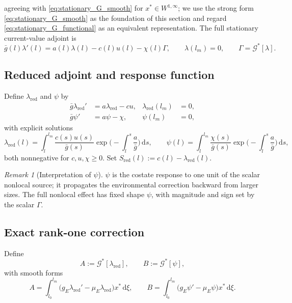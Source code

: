 \documentclass[pdflatex,sn-mathphys-num]{sn-jnl}
\newcommand{\dd}{\,\mathrm{d}}
\theoremstyle{plain}
\theoremstyle{definition}
\theoremstyle{remark}
\newtheorem{remark}[theorem]{Remark}
\begin{document}
agreeing with \eqref{eq:stationary_G_smooth} for $x^*\in W^{1,\infty}$; we use the
strong form \eqref{eq:stationary_G_smooth} as the foundation of this section and
regard \eqref{eq:stationary_G_functional} as an equivalent representation. The
full stationary current-value adjoint is
\begin{equation}\label{eq:full_stationary_adjoint}
\bar g(l)\lambda'(l)=a(l)\lambda(l)-c(l)u(l)-\chi(l)\Gamma,
\qquad
\lambda(l_m)=0,
\qquad
\Gamma=\mathcal G^*[\lambda].
\end{equation}

\subsection{Reduced adjoint and response function}
\label{subsec:reduced_auxiliary}

Define $\lambda_{\mathrm{red}}$ and $\psi$ by
\begin{align}
\bar g\lambda_{\mathrm{red}}'&=a\lambda_{\mathrm{red}}-cu,
&\lambda_{\mathrm{red}}(l_m)&=0,
\label{eq:reduced_adjoint}\\
\bar g\psi'&=a\psi-\chi,
&\psi(l_m)&=0,
\label{eq:auxiliary_psi}
\end{align}
with explicit solutions
\begin{equation}\label{eq:lambda_red_formula}
\lambda_{\mathrm{red}}(l)=\int_l^{l_m}\frac{c(s)u(s)}{\bar g(s)}
\exp\!\Big(-\!\int_l^s\frac{a}{\bar g}\Big)\dd s,
\qquad
\psi(l)=\int_l^{l_m}\frac{\chi(s)}{\bar g(s)}
\exp\!\Big(-\!\int_l^s\frac{a}{\bar g}\Big)\dd s,
\end{equation}
both nonnegative for $c,u,\chi\ge0$. Set
$S_{\mathrm{red}}(l):=c(l)-\lambda_{\mathrm{red}}(l)$.

\begin{remark}[Interpretation of $\psi$]
\label{rmk:psi_interpretation}
$\psi$ is the costate response to one unit of the scalar nonlocal source; it
propagates the environmental correction backward from larger sizes. The full
nonlocal effect has fixed shape $\psi$, with magnitude and sign set by the scalar
$\Gamma$.
\end{remark}

\subsection{Exact rank-one correction}
\label{subsec:rank_one_correction}

Define
\begin{equation}\label{eq:A_B_definition}
A:=\mathcal G^*[\lambda_{\mathrm{red}}],
\qquad
B:=\mathcal G^*[\psi],
\end{equation}
with smooth forms
\[
A=\int_{l_0}^{l_m}\!\big(g_E\lambda_{\mathrm{red}}'-\mu_E\lambda_{\mathrm{red}}\big)x^*\dd\xi,
\qquad
B=\int_{l_0}^{l_m}\!\big(g_E\psi'-\mu_E\psi\big)x^*\dd\xi.
\]
\end{document}
